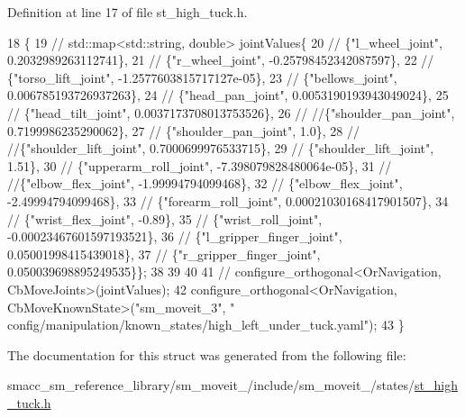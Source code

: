 Definition at line 17 of file st\+\_\+high\+\_\+tuck.\+h.


\begin{DoxyCode}
18     \{
19         \textcolor{comment}{// std::map<std::string, double> jointValues\{}
20         \textcolor{comment}{//     \{"l\_wheel\_joint", 0.2032989263112741\},}
21         \textcolor{comment}{//     \{"r\_wheel\_joint", -0.25798452342087597\},}
22         \textcolor{comment}{//     \{"torso\_lift\_joint", -1.2577603815717127e-05\},}
23         \textcolor{comment}{//     \{"bellows\_joint", 0.006785193726937263\},}
24         \textcolor{comment}{//     \{"head\_pan\_joint", 0.0053190193943049024\},}
25         \textcolor{comment}{//     \{"head\_tilt\_joint", 0.0037173708013753526\},}
26         \textcolor{comment}{//     //\{"shoulder\_pan\_joint", 0.7199986235290062\},}
27         \textcolor{comment}{//     \{"shoulder\_pan\_joint", 1.0\},}
28         \textcolor{comment}{//     //\{"shoulder\_lift\_joint", 0.7000699976533715\},}
29         \textcolor{comment}{//     \{"shoulder\_lift\_joint", 1.51\},}
30         \textcolor{comment}{//     \{"upperarm\_roll\_joint", -7.398079828480064e-05\},}
31         \textcolor{comment}{//     //\{"elbow\_flex\_joint", -1.99994794099468\},}
32         \textcolor{comment}{//     \{"elbow\_flex\_joint", -2.49994794099468\},}
33         \textcolor{comment}{//     \{"forearm\_roll\_joint", 0.00021030168417901507\},}
34         \textcolor{comment}{//     \{"wrist\_flex\_joint", -0.89\},}
35         \textcolor{comment}{//     \{"wrist\_roll\_joint", -0.00023467601597193521\},}
36         \textcolor{comment}{//     \{"l\_gripper\_finger\_joint", 0.05001998415439018\},}
37         \textcolor{comment}{//     \{"r\_gripper\_finger\_joint", 0.050039698895249535\}\};}
38 
39 
40 
41      \textcolor{comment}{//   configure\_orthogonal<OrNavigation, CbMoveJoints>(jointValues);}
42         configure\_orthogonal<OrNavigation, CbMoveKnownState>(\textcolor{stringliteral}{"sm\_moveit\_3"}, \textcolor{stringliteral}{"
      config/manipulation/known\_states/high\_left\_under\_tuck.yaml"});
43     \}
\end{DoxyCode}


The documentation for this struct was generated from the following file\+:\begin{DoxyCompactItemize}
\item 
smacc\+\_\+sm\+\_\+reference\+\_\+library/sm\+\_\+moveit\+\_/include/sm\+\_\+moveit\+\_/states/\hyperlink{st__high__tuck_8h}{st\+\_\+high\+\_\+tuck.\+h}\end{DoxyCompactItemize}
